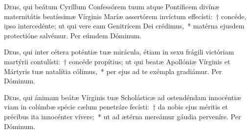 \documentclass[vesperale_romanum.tex]{subfiles}
\begin{document}

\myrule


\duplexmtv


\oratio

 \lettrine{D}{e}us, qui beátum Cyríllum Confessórem tuum atque Pontíficem divínæ maternitátis beatíssimæ Vírginis Maríæ assertórem inví\-ctum effecísti:~† concéde, i\-pso intercedénte; ut qui vere eam Genitrícem Dei crédimus,~* matérna ejusdem prote\-ctióne salvémur.
Per eúmdem Dóminum.



\oratio

\lettrine{D}{e}us, qui inter cétera poténtiæ tuæ mirácula, étiam in sexu frágili vi\-ctóriam martýrii contulísti:~† concéde propítius; ut qui beatæ Apollóniæ Vírginis et Mártyris tuæ natalítia cólimus,~* per ejus ad te exémpla gradiámur. Per Dóminum.

\capitdeseqquad

\myrule

\newpage
{}

\duplex

\oratio

\lettrine{D}{e}us, qui  ánimam beátæ Vírginis tuæ Scholásticæ ad ostendéndam innocéntiæ viam in colúmbæ spécie cælum penetráre fecísti:~† da nobis ejus méritis et précibus ita innocénter vívere;~* ut ad ætérna mereámur gáudia perveníre.
Per Dóminum.



\myrule

\end{document}
